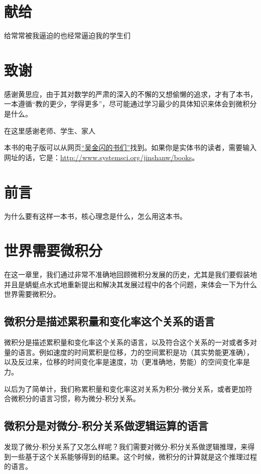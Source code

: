 \documentclass{ctexbook}
\newcommand{\ChapLabel}[1]{\label{#1}}
\begin{document}
\chapter*{献给}

\hspace{4cm}
给常常被我逼迫的也经常逼迫我的学生们

                
     
\chapter*{致谢}

感谢黄思应，由于其对数学的严肃的深入的不懈的又想偷懒的追求，才有了本书，一本遵循“教的更少，学得更多”，尽可能通过学习最少的具体知识来体会到微积分是什么。

在这里感谢老师、学生、家人

本书的电子版可以从网页\href{http://www.systemsci.org/jinshanw/books}{“吴金闪的书们”}找到。如果你是实体书的读者，需要输入网址的话，它是：\href{http://www.systemsci.org/jinshanw/books}{http://www.systemsci.org/jinshanw/books}。

\chapter*{前言}

为什么要有这样一本书，核心理念是什么，怎么用这本书。

\chapter{世界需要微积分}
\ChapLabel{Chap:Needs}
在这一章里，我们通过非常不准确地回顾微积分发展的历史，尤其是我们要假装地并且是蜻蜓点水式地重新提出和解决其发展过程中的各个问题，来体会一下为什么世界需要微积分。


\section{微积分是描述累积量和变化率这个关系的语言}
微积分是描述累积量和变化率这个关系的语言，以及符合这个关系的一对或者多对量的语言。例如速度的时间累积是位移，力的空间累积是功（其实势能更准确），以及反过来，位移的时间变化率是速度，功（更准确地，势能）的空间变化率是力。

以后为了简单计，我们称累积量和变化率这对关系为积分-微分关系，或者更加符合微积分的语言习惯，称为微分-积分关系。

\section{微积分是对微分-积分关系做逻辑运算的语言}
发现了微分-积分关系了又怎么样呢？我们需要对微分-积分关系做逻辑推理，来得到一些基于这个关系能够得到的结果。这个时候，微积分的计算就是这个推理过程的语言。
\end{document}
